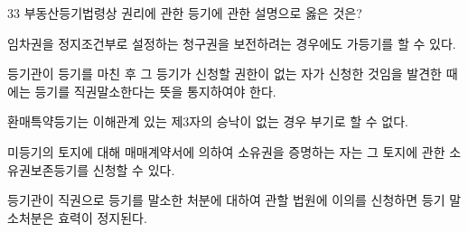 \begin{question}{33}
부동산등기법령상 권리에 관한 등기에 관한 설명으로 옳은 것은?
\begin{choices}
  \item 임차권을 정지조건부로 설정하는 청구권을 보전하려는 경우에도 가등기를 할 수 있다.
  \item 등기관이 등기를 마친 후 그 등기가 신청할 권한이 없는 자가 신청한 것임을 발견한 때에는 등기를 직권말소한다는 뜻을 통지하여야 한다.
  \item 환매특약등기는 이해관계 있는 제3자의 승낙이 없는 경우 부기로 할 수 없다.
  \item 미등기의 토지에 대해 매매계약서에 의하여 소유권을 증명하는 자는 그 토지에 관한 소유권보존등기를 신청할 수 있다.
  \item 등기관이 직권으로 등기를 말소한 처분에 대하여 관할 법원에 이의를 신청하면 등기 말소처분은 효력이 정지된다.
\end{choices}
\end{question}
